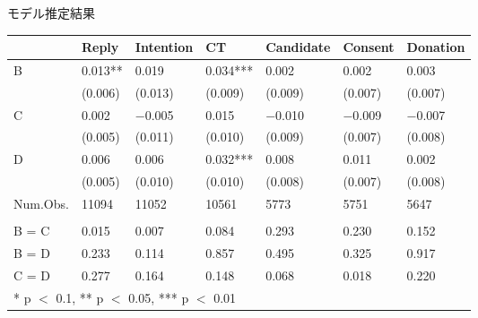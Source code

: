 \documentclass[
      aspectratio=169,
        12pt,
    ]{beamer}
\begin{document}
\begin{frame}{モデル推定結果}
\protect\hypertarget{ux30e2ux30c7ux30ebux63a8ux5b9aux7d50ux679c}{}
\begin{table}
\centering
\fontsize{9}{11}\selectfont
\begin{tabular}[t]{l>{\centering\arraybackslash}p{5em}>{\centering\arraybackslash}p{5em}>{\centering\arraybackslash}p{5em}>{\centering\arraybackslash}p{5em}>{\centering\arraybackslash}p{5em}>{\centering\arraybackslash}p{5em}}
\toprule
  & Reply & Intention & CT & Candidate & Consent & Donation\\
\midrule
B & \num{0.013}** & \num{0.019} & \num{0.034}*** & \num{0.002} & \num{0.002} & \num{0.003}\\
 & (\num{0.006}) & (\num{0.013}) & (\num{0.009}) & (\num{0.009}) & (\num{0.007}) & (\num{0.007})\\
C & \num{0.002} & \num{-0.005} & \num{0.015} & \num{-0.010} & \num{-0.009} & \num{-0.007}\\
 & (\num{0.005}) & (\num{0.011}) & (\num{0.010}) & (\num{0.009}) & (\num{0.007}) & (\num{0.008})\\
D & \num{0.006} & \num{0.006} & \num{0.032}*** & \num{0.008} & \num{0.011} & \num{0.002}\\
 & (\num{0.005}) & (\num{0.010}) & (\num{0.010}) & (\num{0.008}) & (\num{0.007}) & (\num{0.008})\\
\midrule
Num.Obs. & \num{11094} & \num{11052} & \num{10561} & \num{5773} & \num{5751} & \num{5647}\\
\addlinespace[0.3em]
\multicolumn{7}{l}{\textit{F-tests, p-value}}\\
\hspace{1em}B = C & \num{0.015} & \num{0.007} & \num{0.084} & \num{0.293} & \num{0.230} & \num{0.152}\\
\hspace{1em}B = D & \num{0.233} & \num{0.114} & \num{0.857} & \num{0.495} & \num{0.325} & \num{0.917}\\
\hspace{1em}C = D & \num{0.277} & \num{0.164} & \num{0.148} & \num{0.068} & \num{0.018} & \num{0.220}\\
\bottomrule
\multicolumn{7}{l}{\rule{0pt}{1em}* p $<$ 0.1, ** p $<$ 0.05, *** p $<$ 0.01}\\
\end{tabular}
\end{table}
\end{frame}
\end{document}
